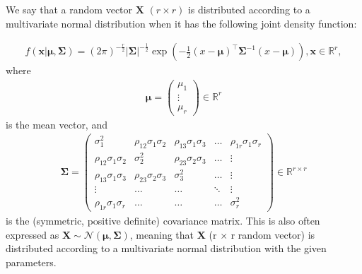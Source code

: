 We say that a random vector $\bm{X}$ $(r \times r)$
is distributed according to a multivariate normal distribution
when it has the following joint density function\autocite[p. 59]{izenman_modern_2008}:
\begin{definition}
    \begin{align}
        f(\bm{x}| \bm{\mu}, \bm{\Sigma})
        = (2\pi)^{-\frac{r}{2}}
        \left|\bm{\Sigma}\right|^{-\frac{1}{2}}
        \exp\left(-\frac{1}{2}(x-\bm{\mu})^\top \bm{\Sigma}^{-1} (x-\bm{\mu})\right),
        \bm{x} \in \mathbb{R}^r,
    \end{align}
    where
    \begin{align}
        \bm{\mu} =
        \begin{pmatrix}
            \mu_1  \\
            \vdots \\
            \mu_r
        \end{pmatrix}
        \in \mathbb{R}^r
    \end{align}
    is the mean vector, and
    \begin{align}
        \bm{\Sigma} =
        \begin{pmatrix}
            \sigma_1^2                & \rho_{12}\sigma_1\sigma_2 & \rho_{13}\sigma_1\sigma_3 & \ldots & \rho_{1r}\sigma_1\sigma_r \\
            \rho_{12}\sigma_1\sigma_2 & \sigma_2^2                & \rho_{23}\sigma_2\sigma_3 & \ldots & \vdots                    \\
            \rho_{13}\sigma_1\sigma_3 & \rho_{23}\sigma_2\sigma_3 & \sigma_3^2                & \ldots & \vdots                    \\
            \vdots                    & \ldots                    & \ldots                    & \ddots & \vdots                    \\
            \rho_{1r}\sigma_1\sigma_r & \ldots                    & \ldots                    & \ldots & \sigma_r^2
        \end{pmatrix}
        \in \mathbb{R}^{r\times r}
    \end{align}
    is the (symmetric, positive definite) covariance matrix.
    This is also often expressed as $\bm{X} \sim \mathcal{N}(\bm{\mu}, \bm{\Sigma})$,
    meaning that $\bm{X}$ (r $\times$ r random vector) is distributed
    according to a multivariate normal distribution with the given parameters.
\end{definition}

